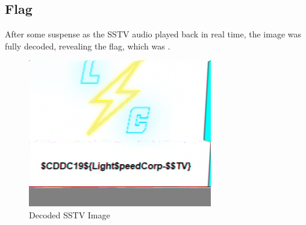 	\pagebreak
	\subsection{Flag}
		After some suspense as the SSTV audio played back in real time, the image was fully decoded, revealing the flag, which
		was .

		\begin{figure}[!htbp]\centering
			\includegraphics[width=80mm, frame]{figures/sstv/SSTV.png} \vspace{5mm}
			\caption{Decoded SSTV Image}
		\end{figure}











